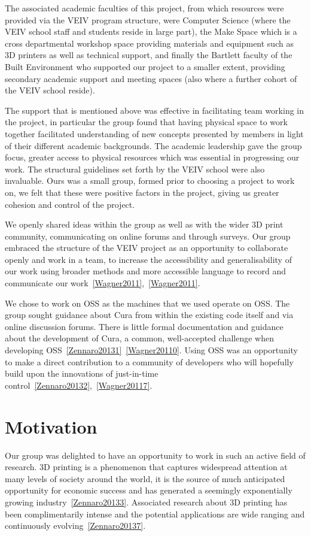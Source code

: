 \documentclass[11pt]{report} %
\begin{document}
The associated academic faculties of this project, from which resources were provided via the VEIV program structure, were Computer Science (where the VEIV school staff and students reside in large part), the Make Space which is a cross departmental workshop space providing materials and equipment such as 3D printers as well as technical support, and finally the Bartlett faculty of the Built Environment who supported our project to a smaller extent, providing secondary academic support and meeting spaces (also where a further cohort of the VEIV school reside).

The support that is mentioned above was effective in facilitating team working in the project, in particular the group found that having physical space to work together facilitated understanding of new concepts presented by members in light of their different academic backgrounds. The academic leadership gave the group focus, greater access to physical resources which was essential in progressing our work. The structural guidelines set forth by the VEIV school were also invaluable. Ours was a small group, formed prior to choosing a project to work on, we felt that these were positive factors in the project, giving us greater cohesion and control of the project. 

We openly shared ideas within the group as well as with the wider 3D print community, communicating on online forums and through surveys. Our group embraced the structure of the VEIV project as an opportunity to collaborate openly and work in a team, to increase the accessibility and generalisability of our work using broader methods and more accessible language to record and communicate our work~\ref{Wagner2011},~\ref{Wagner2011}. 

We chose to work on OSS as the machines that we used operate on OSS. The group sought guidance about Cura from within the existing code itself and via online discussion forums. There is little formal documentation and guidance about the development of Cura, a common, well-accepted challenge when developing OSS~\ref{Zennaro20131}~\ref{Wagner20110}. Using OSS was an opportunity to make a direct contribution to a community of developers who will hopefully build upon the innovations of just-in-time control~\ref{Zennaro20132},~\ref{Wagner20117}. 





\section{Motivation}
Our group was delighted to have an opportunity to work in such an active field of research. 3D printing is a phenomenon that captures widespread attention at many levels of society around the world, it is the source of much anticipated opportunity for economic success and has generated a seemingly exponentially growing industry~\ref{Zennaro20133}. Associated research about 3D printing has been complimentarily intense and the potential applications are wide ranging and continuously evolving~\ref{Zennaro20137}. 
\end{document}
